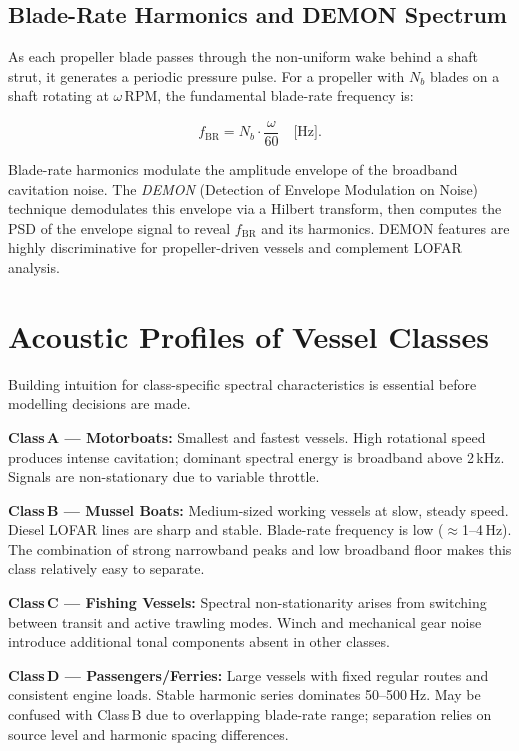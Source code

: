 \documentclass[conference]{IEEEtran}
\begin{document}
\subsection{Blade-Rate Harmonics and DEMON Spectrum}

As each propeller blade passes through the non-uniform wake behind a shaft
strut, it generates a periodic pressure pulse. For a propeller with $N_b$
blades on a shaft rotating at $\omega$\,RPM, the fundamental blade-rate
frequency is:

\begin{equation}
  f_\mathrm{BR} = N_b \cdot \frac{\omega}{60} \quad \text{[Hz].}
  \label{eq:blade_rate}
\end{equation}

Blade-rate harmonics modulate the amplitude envelope of the broadband
cavitation noise. The \textit{DEMON} (Detection of Envelope Modulation on
Noise) technique demodulates this envelope via a Hilbert transform, then
computes the PSD of the envelope signal to reveal $f_\mathrm{BR}$ and its
harmonics. DEMON features are highly discriminative for propeller-driven
vessels and complement LOFAR analysis.

% 
\section{Acoustic Profiles of Vessel Classes}

Building intuition for class-specific spectral characteristics is essential
before modelling decisions are made.

\textbf{Class\,A --- Motorboats:} Smallest and fastest vessels. High
rotational speed produces intense cavitation; dominant spectral energy is
broadband above 2\,kHz. Signals are non-stationary due to variable throttle.

\textbf{Class\,B --- Mussel Boats:} Medium-sized working vessels at slow,
steady speed. Diesel LOFAR lines are sharp and stable. Blade-rate frequency
is low ($\approx$1--4\,Hz). The combination of strong narrowband peaks and
low broadband floor makes this class relatively easy to separate.

\textbf{Class\,C --- Fishing Vessels:} Spectral non-stationarity arises from
switching between transit and active trawling modes. Winch and mechanical gear
noise introduce additional tonal components absent in other classes.

\textbf{Class\,D --- Passengers/Ferries:} Large vessels with fixed regular
routes and consistent engine loads. Stable harmonic series dominates
50--500\,Hz. May be confused with Class\,B due to overlapping blade-rate
range; separation relies on source level and harmonic spacing differences.
\end{document}
